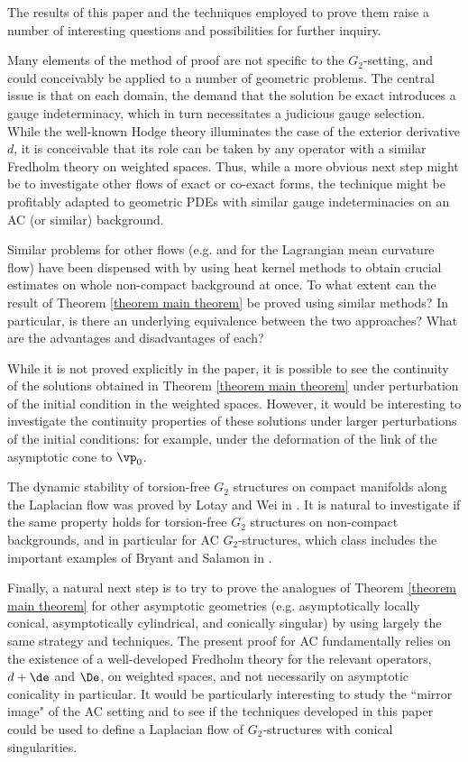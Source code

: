 \documentclass[hidelinks, 12pt, oneside, reqno]{amsart}
\begin{document}
The results of this paper and the techniques employed to prove them raise a number of interesting questions and possibilities for further inquiry. 

Many elements of the method of proof are not specific to the $G_2$-setting, and could conceivably be applied to a number of geometric problems. The central issue is that on each domain, the demand that the solution be exact introduces a gauge indeterminacy, which in turn necessitates a judicious gauge selection. While the well-known Hodge theory illuminates the case of the exterior derivative $d$, it is conceivable that its role can be taken by any operator with a similar Fredholm theory on weighted spaces. Thus, while a more obvious next step might be to investigate other flows of exact or co-exact forms, the technique might be profitably adapted to geometric PDEs with similar gauge indeterminacies on an AC (or similar) background.


Similar problems for other flows (e.g. \cite{LMCFwithsings} and \cite{SuACLMCF} for the Lagrangian mean curvature flow) have been dispensed with by using heat kernel methods to obtain crucial estimates on whole non-compact background at once. To what extent can the result of Theorem \ref{theorem main theorem} be proved using similar methods? In particular, is there an underlying equivalence between the two approaches? What are the advantages and disadvantages of each?

While it is not proved explicitly in the paper, it is possible to see the continuity of the solutions obtained in Theorem \ref{theorem main theorem} under perturbation of the initial condition in the weighted spaces. However, it would be interesting to investigate the continuity properties of these solutions under larger perturbations of the initial conditions: for example, under the deformation of the link of the asymptotic cone to $\vp_0$. 

The dynamic stability of torsion-free $G_2$ structures on compact manifolds along the Laplacian flow was proved by Lotay and Wei in \cite{LotayWeiStability}. It is natural to investigate if the same property holds for torsion-free $G_2$ structures on non-compact backgrounds, and in particular for AC $G_2$-structures, which class includes the important examples of Bryant and Salamon in \cite{BryantSalamonExceptionalHolonomy}. 

Finally, a natural next step is to try to prove the analogues of Theorem \ref{theorem main theorem} for other asymptotic geometries (e.g. asymptotically locally conical, asymptotically cylindrical, and conically singular) by using largely the same strategy and techniques. The present proof for AC fundamentally relies on the existence of a well-developed Fredholm theory for the relevant operators, $d + \de$ and $\De$, on weighted spaces, and not necessarily on asymptotic conicality in particular. It would be particularly interesting to study the ``mirror image" of the AC setting and to see if the techniques developed in this paper could be used to define a Laplacian flow of $G_2$-structures with conical singularities.  
\end{document}
